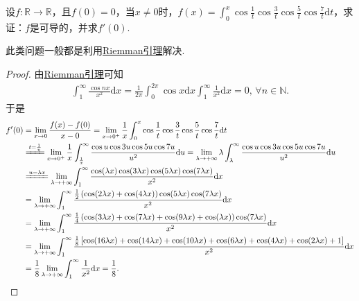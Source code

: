 \documentclass[../../main.tex]{subfiles}%
\begin{document}
\begin{example}
设$f:\mathbb{R}\to\mathbb{R}$，且$f(0)=0$，当$x\neq0$时，$f(x)=\int_0^x\cos\frac{1}{t}\cos\frac{3}{t}\cos\frac{5}{t}\cos\frac{7}{t}\mathrm{d}t$，求证：$f$是可导的，并求$f'(0)$.
\end{example}
\begin{note}
此类问题一般都是利用\hyperref[theorem:Riemann引理]{Riemman引理}解决.
\end{note}
\begin{proof}
由\hyperref[theorem:Riemann引理]{Riemman引理}可知
\begin{align*}
\int_1^{\infty} \frac{\cos nx}{x^2} \mathrm{d}x = \frac{1}{2\pi} \int_0^{2\pi} \cos x \mathrm{d}x \int_1^{\infty} \frac{1}{x^2} \mathrm{d}x = 0, \, \forall n \in \mathbb{N}.
\end{align*}
于是
\begin{align*}
f'(0) &= \lim_{x \to 0} \frac{f(x) - f(0)}{x - 0} = \lim_{x \to 0^+} \frac{1}{x} \int_0^x \cos \frac{1}{t} \cos \frac{3}{t} \cos \frac{5}{t} \cos \frac{7}{t} \mathrm{d}t \\
&\xlongequal{t = \frac{1}{u}} \lim_{x \to 0^+} \frac{1}{x} \int_{\frac{1}{x}}^{\infty} \frac{\cos u \cos 3u \cos 5u \cos 7u}{u^2} \mathrm{d}u = \lim_{\lambda \to +\infty} \lambda \int_{\lambda}^{\infty} \frac{\cos u \cos 3u \cos 5u \cos 7u}{u^2} \mathrm{d}u \\
&\xlongequal{u = \lambda x} \lim_{\lambda \to +\infty} \int_1^{\infty} \frac{\cos(\lambda x) \cos(3\lambda x) \cos(5\lambda x) \cos(7\lambda x)}{x^2} \mathrm{d}x \\
&= \lim_{\lambda \to +\infty} \int_1^{\infty} \frac{\frac{1}{2} \left( \cos(2\lambda x) + \cos(4\lambda x) \right) \cos(5\lambda x) \cos(7\lambda x)}{x^2} \mathrm{d}x \\
&= \lim_{\lambda \to +\infty} \int_1^{\infty} \frac{\frac{1}{4} \left( \cos(3\lambda x) + \cos(7\lambda x) + \cos(9\lambda x) + \cos(\lambda x) \right) \cos(7\lambda x)}{x^2} \mathrm{d}x \\
&= \lim_{\lambda \to +\infty} \int_1^{\infty} \frac{\frac{1}{8} \left[ \cos(16\lambda x) + \cos(14\lambda x) + \cos(10\lambda x) + \cos(6\lambda x) + \cos(4\lambda x) + \cos(2\lambda x) + 1 \right]}{x^2} \mathrm{d}x \\
&= \frac{1}{8} \lim_{\lambda \to +\infty} \int_1^{\infty} \frac{1}{x^2} \mathrm{d}x = \frac{1}{8}.
\end{align*}
\end{proof}
\end{document}
